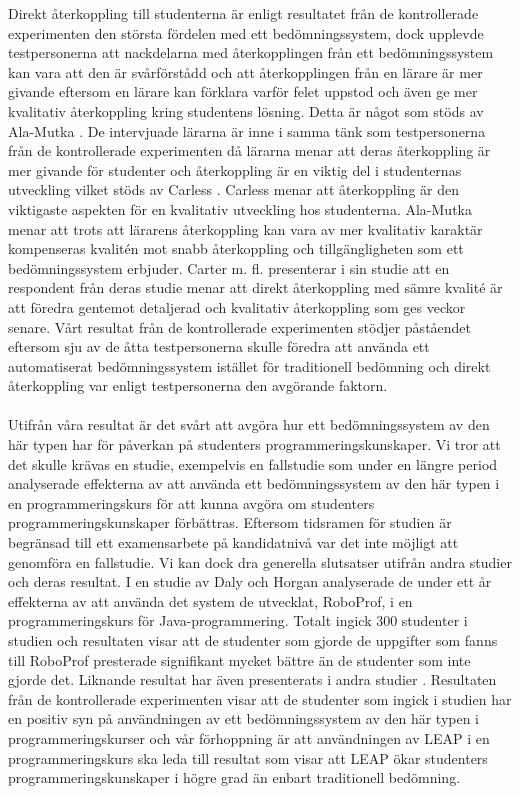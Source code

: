 \documentclass[a4paper,11pt]{article}
\begin{document}
{Direkt återkoppling till studenterna är enligt resultatet från de kontrollerade experimenten den största fördelen med ett bedömningssystem, dock upplevde testpersonerna att nackdelarna med återkopplingen från ett bedömningssystem kan vara att den är svårförstådd och att återkopplingen från en lärare är mer givande eftersom en lärare kan förklara varför felet uppstod och även ge mer kvalitativ återkoppling kring studentens lösning. Detta är något som stöds av Ala-Mutka \cite{ala-mutka}. De intervjuade lärarna är inne i samma tänk som testpersonerna från de kontrollerade experimenten då lärarna menar att deras återkoppling är mer givande för studenter och återkoppling är en viktig del i studenternas utveckling vilket stöds av Carless \cite{carless}. Carless menar att återkoppling är den viktigaste aspekten för en kvalitativ utveckling hos studenterna. Ala-Mutka \cite{ala-mutka} menar att trots att lärarens återkoppling kan vara av mer kvalitativ karaktär kompenseras kvalitén mot snabb återkoppling och tillgängligheten som ett bedömningssystem erbjuder. Carter m. fl. \cite{carter} presenterar i sin studie att en respondent från deras studie menar att direkt återkoppling med sämre kvalité är att föredra gentemot detaljerad och kvalitativ återkoppling som ges veckor senare. Vårt resultat från de kontrollerade experimenten stödjer påståendet eftersom sju av de åtta testpersonerna skulle föredra att använda ett automatiserat bedömningssystem istället för traditionell bedömning och direkt återkoppling var enligt testpersonerna den avgörande faktorn.
\\
\\
Utifrån våra resultat är det svårt att avgöra hur ett bedömningssystem av den här typen har för påverkan på studenters programmeringskunskaper. Vi tror att det skulle krävas en studie, exempelvis en fallstudie som under en längre period analyserade effekterna av att använda ett bedömningssystem av den här typen i en programmeringskurs för att kunna avgöra om studenters programmeringskunskaper förbättras. Eftersom tidsramen för studien är begränsad till ett examensarbete på kandidatnivå var det inte möjligt att genomföra en fallstudie. Vi kan dock dra generella slutsatser utifrån andra studier och deras resultat. I en studie av Daly och Horgan \cite{roboprof_4} analyserade de under ett år effekterna av att använda det system de utvecklat, RoboProf, i en programmeringskurs för Java-programmering. Totalt ingick 300 studenter i studien och resultaten visar att de studenter som gjorde de uppgifter som fanns till RoboProf presterade signifikant mycket bättre än de studenter som inte gjorde det. Liknande resultat har även presenterats i andra studier \cite{higgins_coursemarker_12} \cite{japanerna_1}. Resultaten från de kontrollerade experimenten visar att de studenter som ingick i studien har en positiv syn på användningen av ett bedömningssystem av den här typen i programmeringskurser och vår förhoppning är att användningen av LEAP i en programmeringskurs ska leda till resultat som visar att LEAP ökar studenters programmeringskunskaper i högre grad än enbart traditionell bedömning. 
}
\end{document}
